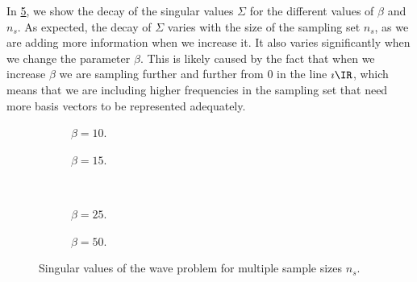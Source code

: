In \cref{fig:wave-basisS}, we show the decay of the singular values $\Sigma$ for the different values of $\beta$ and $n_s$. As expected, the decay of $\Sigma$ varies with the size of the sampling set $n_s$, as we are adding more information when we increase it. It also varies significantly when we change the parameter $\beta$. This is likely caused by the fact that when we increase $\beta$ we are sampling further and further from $0$ in the line $\imath \IR$, which means that we are including higher frequencies in the sampling set that need more basis vectors to be represented adequately.
\begin{figure}[H]
	\centering
	\begin{subfigure}[htb!]{0.49\textwidth}
	    \centering
	    
        \caption{$\beta=10$.} 
        \label{fig:wave-basis-b1} 
    \end{subfigure}
    \begin{subfigure}[htb!]{0.49\textwidth}
	    \centering
	    
        \caption{$\beta=15$.} 
        \label{fig:wave-basis-b2} 
    \end{subfigure} \\
    \vspace{-0.55cm}
    \begin{subfigure}[htb!]{0.49\textwidth}
	    \centering
	    
        \caption{$\beta=25$.} 
        \label{fig:wave-basis-b3} 
    \end{subfigure}
    \begin{subfigure}[htb!]{0.49\textwidth}
	    \centering
	    
        \caption{$\beta=50$.} 
        \label{fig:wave-basis-b4} 
    \end{subfigure}
    \caption{Singular values of the wave problem for multiple sample sizes $n_s$.} 
	\label{fig:wave-basisS} 
\end{figure}

